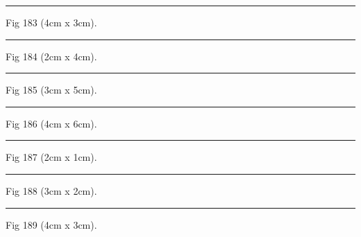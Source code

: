 \documentclass[a4paper,11pt]{article}
\begin{document}
\begin{swarmwrap}%
  \begin{minipage}[t]{4cm}
    \centering
    \rule{\linewidth}{3cm}
    {\footnotesize Fig 183 (4cm x 3cm).}
  \end{minipage}%
\end{swarmwrap}%
\swarmwrapnext
\lipsum[33]%

\begin{swarmwrap}%
  \begin{minipage}[t]{2cm}
    \centering
    \rule{\linewidth}{4cm}
    {\footnotesize Fig 184 (2cm x 4cm).}
  \end{minipage}%
\end{swarmwrap}%
\swarmwrapnext
\lipsum[34]%

\begin{swarmwrap}%
  \begin{minipage}[t]{3cm}
    \centering
    \rule{\linewidth}{5cm}
    {\footnotesize Fig 185 (3cm x 5cm).}
  \end{minipage}%
\end{swarmwrap}%
\swarmwrapnext
\lipsum[35]%

\begin{swarmwrap}%
  \begin{minipage}[t]{4cm}
    \centering
    \rule{\linewidth}{6cm}
    {\footnotesize Fig 186 (4cm x 6cm).}
  \end{minipage}%
\end{swarmwrap}%
\swarmwrapnext
\lipsum[36]%

\begin{swarmwrap}%
  \begin{minipage}[t]{2cm}
    \centering
    \rule{\linewidth}{1cm}
    {\footnotesize Fig 187 (2cm x 1cm).}
  \end{minipage}%
\end{swarmwrap}%
\swarmwrapnext
\lipsum[37]%

\begin{swarmwrap}%
  \begin{minipage}[t]{3cm}
    \centering
    \rule{\linewidth}{2cm}
    {\footnotesize Fig 188 (3cm x 2cm).}
  \end{minipage}%
\end{swarmwrap}%
\swarmwrapnext
\lipsum[38]%

\begin{swarmwrap}%
  \begin{minipage}[t]{4cm}
    \centering
    \rule{\linewidth}{3cm}
    {\footnotesize Fig 189 (4cm x 3cm).}
  \end{minipage}%
\end{swarmwrap}%
\swarmwrapnext
\lipsum[39]%
\end{document}
